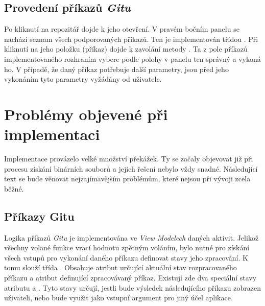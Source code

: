     \subsection{Provedení příkazů \emph{Gitu}}
    Po kliknutí na repozitář dojde k jeho otevření. V pravém bočním panelu se nachází seznam všech podporovaných příkazů. Ten je implementován třídou . Při kliknutí na jeho položku (příkaz) dojde k zavolání metody  . Ta z pole příkazů implementovaného rozhraním  vybere podle polohy v panelu ten správný a vykoná ho. V případě, že daný příkaz potřebuje další parametry, jsou před jeho vykonáním tyto parametry vyžádány od uživatele.

\section{Problémy objevené při implementaci}\label{sec:problemy_implem}
Implementace provázelo velké množství překážek. Ty se začaly objevovat již při procesu získání binárních souborů a jejich řešení nebylo vždy snadné. Následující text se bude věnovat nejzajímavějším problémům, které nejsou při vývoji zcela běžné.

    \subsection{Příkazy Gitu}
    Logika příkazů \emph{Gitu} je implementována ve \emph{View Modelech} daných aktivit. Jelikož všechny volané funkce vrací hodnotu zpětným voláním, bylo nutné pro získání všech vstupů pro vykonání daného příkazu definovat stavy jeho zpracování. K tomu slouží třída . Obsahuje atribut  určující aktuální stav rozpracovaného příkazu a atribut  definující zpracovávaný příkaz. Existují zde dva speciální stavy atributu   a . Tyto stavy určují, jestli bude výsledek následujícího příkazu zobrazen uživateli, nebo bude využit jako vstupní argument pro jiný účel aplikace.

